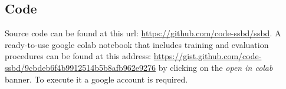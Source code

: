 \documentclass{article}
\begin{document}
\subsection{Code}
\label{sec:code}
Source code can be found at this url: \url{https://github.com/code-ssbd/ssbd}.
A ready-to-use google colab notebook that includes training and evaluation procedures can be found at this address: \url{https://gist.github.com/code-ssbd/9cbdeb6f4b9912514b5b8afb962e9276} by clicking on the \textit{open in colab} banner. To execute it a google account is required.


% 
% 
%
\end{document}
